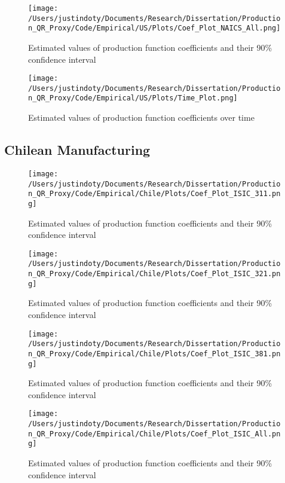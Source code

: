 \documentclass[11pt]{article}
\begin{document}
\begin{figure}[H]
\centering
\caption{Estimated values of production function coefficients and their 90\% confidence interval}
\texttt{[image: /Users/justindoty/Documents/Research/Dissertation/Production\_QR\_Proxy/Code/Empirical/US/Plots/Coef\_Plot\_NAICS\_All.png]}
\end{figure}

\begin{figure}[H]
\centering
\caption{Estimated values of production function coefficients over time}
\texttt{[image: /Users/justindoty/Documents/Research/Dissertation/Production\_QR\_Proxy/Code/Empirical/US/Plots/Time\_Plot.png]}
\end{figure}

\subsection{Chilean Manufacturing}




\begin{figure}[H]
\centering
\caption{Estimated values of production function coefficients and their 90\% confidence interval}
\texttt{[image: /Users/justindoty/Documents/Research/Dissertation/Production\_QR\_Proxy/Code/Empirical/Chile/Plots/Coef\_Plot\_ISIC\_311.png]}
\end{figure}

\begin{figure}[H]
\centering
\caption{Estimated values of production function coefficients and their 90\% confidence interval}
\texttt{[image: /Users/justindoty/Documents/Research/Dissertation/Production\_QR\_Proxy/Code/Empirical/Chile/Plots/Coef\_Plot\_ISIC\_321.png]}
\end{figure}

\begin{figure}[H]
\centering
\caption{Estimated values of production function coefficients and their 90\% confidence interval}
\texttt{[image: /Users/justindoty/Documents/Research/Dissertation/Production\_QR\_Proxy/Code/Empirical/Chile/Plots/Coef\_Plot\_ISIC\_381.png]}
\end{figure}

\begin{figure}[H]
\centering
\caption{Estimated values of production function coefficients and their 90\% confidence interval}
\texttt{[image: /Users/justindoty/Documents/Research/Dissertation/Production\_QR\_Proxy/Code/Empirical/Chile/Plots/Coef\_Plot\_ISIC\_All.png]}
\end{figure}
\end{document}
